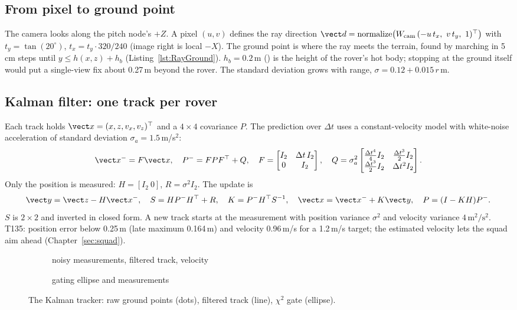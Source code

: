 \subsection{From pixel to ground point}
The camera looks along the pitch node's $+Z$. A pixel $(u,v)$ defines the ray direction $\vect d=\mathrm{normalize}\bigl(W_\text{cam}\,(-u\,t_x,\ v\,t_y,\ 1)^\top\bigr)$ with $t_y=\tan(20^\circ)$, $t_x=t_y\cdot320/240$ (image right is local $-X$). The ground point
is where the ray meets the terrain, found by marching in 5\,cm steps until $y\le h(x,z)+h_b$ (Listing~\ref{lst:RayGround}). $h_b=0.2$\,m () is the height of the rover's hot body; stopping at the ground itself would put a single-view fix about 0.27\,m beyond the rover. The standard deviation grows with range, $\sigma=0.12+0.015\,r$\,m.
\lstRayGround

\subsection{Kalman filter: one track per rover}
Each track holds $\vect x=(x,z,v_x,v_z)^\top$ and a $4\times4$ covariance $P$. The prediction over $\Delta t$ uses a constant-velocity model with white-noise acceleration of standard deviation $\sigma_a=1.5$\,m/s$^2$:
\begin{equation}
\vect x^-=F\vect x,\quad P^-=FPF^\top+Q,\quad F=\begin{bmatrix}I_2&\Delta t\,I_2\\0&I_2\end{bmatrix},\quad
Q=\sigma_a^2\begin{bmatrix}\tfrac{\Delta t^4}{4}I_2&\tfrac{\Delta t^3}{2}I_2\\\tfrac{\Delta t^3}{2}I_2&\Delta t^2I_2\end{bmatrix}.
\end{equation}
Only the position is measured: $H=[I_2\ 0]$, $R=\sigma^2I_2$. The update is
\begin{equation}
\vect y=\vect z-H\vect x^-,\quad S=HP^-H^\top+R,\quad K=P^-H^\top S^{-1},\quad \vect x=\vect x^-+K\vect y,\quad P=(I-KH)P^-.
\end{equation}
$S$ is $2\times2$ and inverted in closed form. A new track starts at the measurement with position variance $\sigma^2$ and velocity variance $4\,\text{m}^2/\text{s}^2$. T135: position error below 0.25\,m (late maximum 0.164\,m) and velocity 0.96\,m/s for a
1.2\,m/s target; the estimated velocity lets the squad aim ahead (Chapter~\ref{sec:squad}).
\lstPredict
\lstKalman
\begin{figure}[h]
\centering
\begin{subfigure}{0.49\linewidth}\caption{noisy measurements, filtered track, velocity}\end{subfigure}
\begin{subfigure}{0.49\linewidth}\caption{gating ellipse and measurements}\end{subfigure}
\caption{The Kalman tracker: raw ground points (dots), filtered track (line), $\chi^2$ gate (ellipse).}
\end{figure}

